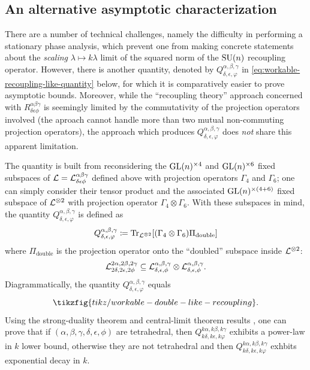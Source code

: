 \documentclass[notitlepage, 10pt]{article}
\begin{document}
\subsection{An alternative asymptotic characterization}

There are a number of technical challenges, namely the difficulty in performing a stationary phase analysis, which prevent one from making concrete statements about the \textit{scaling} $\lambda \mapsto k\lambda$ limit of the squared norm of the $\operatorname{SU}(n)$ recoupling operator.
However, there is another quantity, denoted by $Q^{\alpha,\beta,\gamma}_{\delta,\epsilon,\varphi}$ in \cref{eq:workable-recoupling-like-quantity} below, for which it is comparatively easier to prove asymptotic bounds.
Moreover, while the ``recoupling theory'' approach concerned with $R^{\alpha\beta\gamma}_{\delta\epsilon\phi}$ is seemingly limited by the commutativity of the projection operators involved (the aproach cannot handle more than two mutual non-commuting projection operators), the approach which produces $Q^{\alpha,\beta,\gamma}_{\delta,\epsilon,\varphi}$ does \textit{not} share this apparent limitation. 

The quantity is built from reconsidering the $\operatorname{GL}(n)^{\times 4}$ and $\operatorname{GL}(n)^{\times 6}$ fixed subspaces of $\mathcal L = \mathcal L^{\alpha \beta \gamma}_{\delta \epsilon \phi}$ defined above with projection operators $\Gamma_{4}$ and $\Gamma_{6}$; one can simply consider their tensor product and the associated $\operatorname{GL}(n)^{\times (4 + 6)}$ fixed subspace of $\mathcal L^{\otimes 2}$ with projection operator $\Gamma_{4} \otimes \Gamma_{6}$.
With these subspaces in mind, the quantity $Q^{\alpha,\beta,\gamma}_{\delta,\epsilon,\varphi}$ is defined as 
\begin{equation}
    Q^{\alpha,\beta,\gamma}_{\delta,\epsilon,\varphi} \coloneqq \operatorname{Tr}_{\mathcal L^{\otimes 2}}[(\Gamma_{4} \otimes \Gamma_{6}) \Pi_{\mathrm{double}}]
\end{equation}
where $\Pi_{\mathrm{double}}$ is the projection operator onto the ``doubled'' subspace inside $\mathcal L^{\otimes 2}$:
\begin{equation}
    \mathcal L^{2\alpha, 2\beta, 2\gamma}_{2\delta, 2\epsilon, 2\phi} \subseteq \mathcal L^{\alpha, \beta, \gamma}_{\delta, \epsilon, \phi} \otimes \mathcal L^{\alpha, \beta, \gamma}_{\delta, \epsilon, \phi}.
\end{equation}
Diagrammatically, the quantity $Q^{\alpha,\beta,\gamma}_{\delta,\epsilon,\varphi}$ equals
\begin{equation}
    \label{eq:workable-recoupling-like-quantity}
    \tikzfig{tikz/workable-double-like-recoupling}.
\end{equation}
Using the strong-duality theorem and central-limit theorem results \cite[Theorem 1 \& Proposition 3.1]{franks2020minimal}, one can prove that if $(\alpha,\beta,\gamma,\delta,\epsilon,\phi)$ are tetrahedral, then $Q^{k\alpha,k\beta,k\gamma}_{k\delta,k\epsilon,k\varphi}$ exhibits a power-law in $k$ lower bound, otherwise they are not tetrahedral and then $Q^{k\alpha,k\beta,k\gamma}_{k\delta,k\epsilon,k\varphi}$ exhbits exponential decay in $k$.
\end{document}
